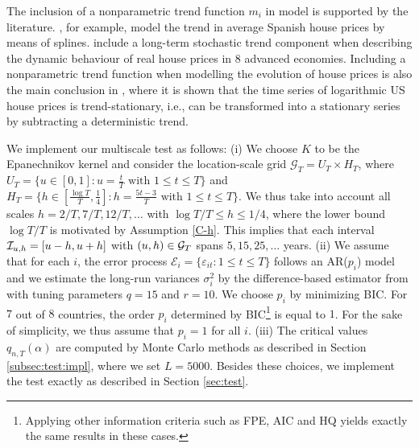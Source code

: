 \documentclass[12pt]{article}
\makeatletter
\renewcommand{\eqref}[1]{\tagform@{\ref{#1}}}
\makeatother
\begin{document}
The inclusion of a nonparametric trend function $m_i$ in model \eqref{eq:model:app4} is supported by the literature. \cite{Ugarte2009}, for example, model the trend in average Spanish house prices by means of splines. \cite{Winter2022} include a long-term stochastic trend component when describing the dynamic behaviour of real house prices in $8$ advanced economies. Including a nonparametric trend function when modelling the evolution of house prices is also the main conclusion in \cite{Zhang2016}, where it is shown that the time series of logarithmic US house prices is trend-stationary, i.e., can be transformed into a stationary series by subtracting a deterministic trend.


We implement our multiscale test as follows: 
(i) We choose $K$ to be the Epanechnikov kernel and consider the location-scale grid $\mathcal{G}_T = U_T \times H_T$, where $U_T = \{ u \in [0,1]: u = \textstyle{\frac{t}{T}} \text{ with } 1 \le t \le T \}$ and $H_T = \{ h \in [ \textstyle{\frac{\log T}{T}}, \textstyle{\frac{1}{4}} ]:  h = \textstyle{\frac{5t - 3}{T}} \text{ with } 1 \le t \le T \}$. We thus take into account
all scales $h=2/T, 7/T, 12/T,\ldots$ with $\log T /T \le h \le 1/4$, where the lower bound $\log T / T$ is motivated by Assumption \ref{C-h}. This implies that each interval $\mathcal{I}_{u, h} =[u-h,u+h]$ with $(u,h) \in \mathcal{G}_T$ spans $5, 15, 25, \ldots$ years.   
(ii) We assume that for each $i$, the error process $\mathcal{E}_i = \{\varepsilon_{it}: 1 \leq t \leq T\}$ follows an AR($p_i$) model and we estimate the long-run variances $\sigma_i^2$ by the difference-based estimator from \cite{KhismatullinaVogt2020} with tuning parameters $q=15$ and $r=10$. We choose $p_i$ by minimizing BIC. For $7$ out of $8$ countries, the order $p_i$ determined by BIC\footnote{Applying other information criteria such as FPE, AIC and HQ yields exactly the same results in these cases.} is equal to $1$. For the sake of simplicity, we thus assume that $p_i = 1$ for all $i$.
(iii) The critical values $q_{n, T}(\alpha)$ are computed by Monte Carlo methods as described in Section \ref{subsec:test:impl}, where we set $L=5000$.
Besides these choices, we implement the test exactly as described in Section \ref{sec:test}.  
\end{document}
